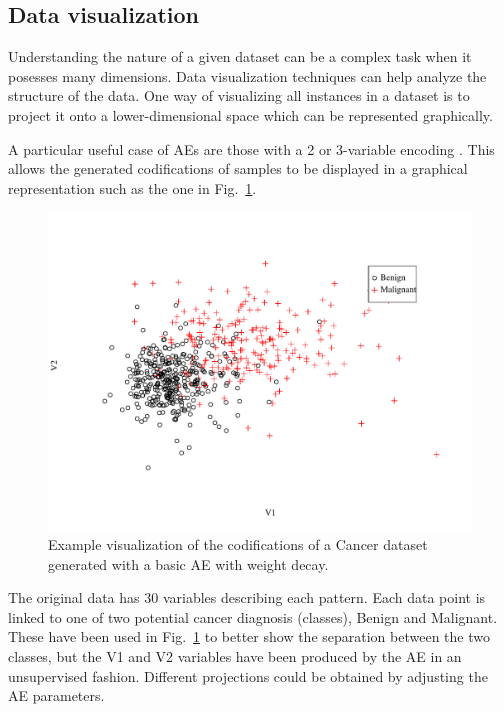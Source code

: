 \subsection{Data visualization}\label{p1Sec.Visualization}

Understanding the nature of a given dataset can be a complex task when it posesses many dimensions. Data visualization techniques  can help analyze the structure of the data. One way of visualizing all instances in a dataset is to project it onto a lower-dimensional space which can be represented graphically.

A particular useful case of AEs are those with a 2 or 3-variable encoding . This allows the generated codifications of samples to be displayed in a graphical representation such as the one in Fig.~\ref{p1Fig.Cancer}.

\begin{figure}[h!]
  \centering
  \includegraphics[width=.95\linewidth]{cancer_2var.pdf}
  \caption{\label{p1Fig.Cancer}Example visualization of the codifications of a Cancer dataset generated with a basic AE with weight decay.}
\end{figure}

The original data  has 30 variables describing each pattern. Each data point is linked to one of two potential cancer diagnosis (classes), Benign and Malignant. These have been used in Fig.~\ref{p1Fig.Cancer} to better show the separation between the two classes, but the V1 and V2 variables have been produced by the AE in an unsupervised fashion. Different projections could be obtained by adjusting the AE parameters.

